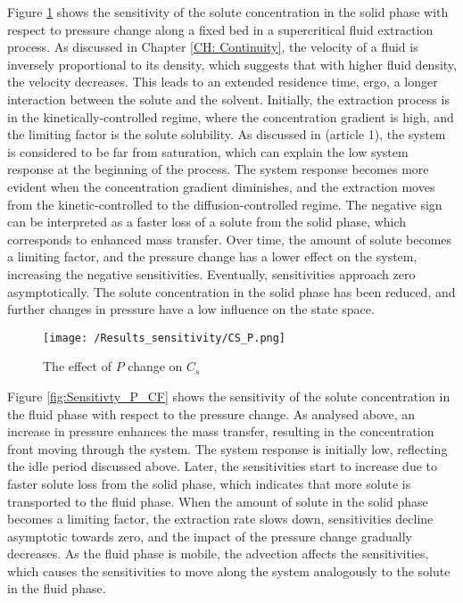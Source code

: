 \documentclass[../Article_Sensitivity_Analsysis.tex]{subfiles}
\begin{document}
	Figure \ref{fig:Sensitivty_P_CS} shows the sensitivity of the solute concentration in the solid phase with respect to pressure change along a fixed bed in a supercritical fluid extraction process. As discussed in Chapter \ref{CH: Continuity}, the velocity of a fluid is inversely proportional to its density, which suggests that with higher fluid density, the velocity decreases. This leads to an extended residence time, ergo, a longer interaction between the solute and the solvent. Initially, the extraction process is in the kinetically-controlled regime, where the concentration gradient is high, and the limiting factor is the solute solubility. As discussed in ({\color{red}article 1}), the system is considered to be far from saturation, which can explain the low system response at the beginning of the process. The system response becomes more evident when the concentration gradient diminishes, and the extraction moves from the kinetic-controlled to the diffusion-controlled regime. The negative sign can be interpreted as a faster loss of a solute from the solid phase, which corresponds to enhanced mass transfer. Over time, the amount of solute becomes a limiting factor, and the pressure change has a lower effect on the system, increasing the negative sensitivities. Eventually, sensitivities approach zero asymptotically. The solute concentration in the solid phase has been reduced, and further changes in pressure have a low influence on the state space.

	\begin{figure}[h!]
		\centering
		\texttt{[image: /Results\_sensitivity/CS\_P.png]}
		\caption{The effect of $P$ change on $C_s$}
		\label{fig:Sensitivty_P_CS}
	\end{figure}
	
	Figure \ref{fig:Sensitivty_P_CF} shows the sensitivity of the solute concentration in the fluid phase with respect to the pressure change. As analysed above, an increase in pressure enhances the mass transfer, resulting in the concentration front moving through the system. The system response is initially low, reflecting the idle period discussed above. Later, the sensitivities start to increase due to faster solute loss from the solid phase, which indicates that more solute is transported to the fluid phase. When the amount of solute in the solid phase becomes a limiting factor, the extraction rate slows down, sensitivities decline asymptotic towards zero, and the impact of the pressure change gradually decreases. As the fluid phase is mobile, the advection affects the sensitivities, which causes the sensitivities to move along the system analogously to the solute in the fluid phase.
	
\end{document}
